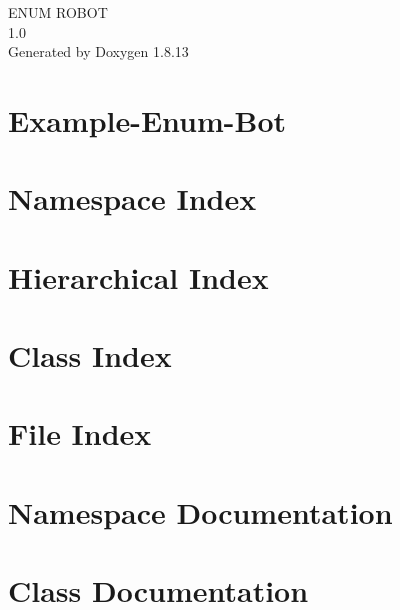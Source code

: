 \documentclass[twoside]{book}
\newcommand{\+}{\discretionary{\mbox{\scriptsize$\hookleftarrow$}}{}{}}
\newcommand{\clearemptydoublepage}{%
  \newpage{\pagestyle{empty}\cleardoublepage}%
}
\begin{document}
\hypersetup{pageanchor=false,
             bookmarksnumbered=true,
             pdfencoding=unicode
            }
\begin{titlepage}
\vspace*{7cm}
\begin{center}%
{\Large E\+N\+UM R\+O\+B\+OT \\[1ex]\large 1.\+0 }\\
\vspace*{1cm}
{\large Generated by Doxygen 1.8.13}\\
\end{center}
\end{titlepage}
\clearemptydoublepage
{}
\tableofcontents
\clearemptydoublepage
{}
\hypersetup{pageanchor=true}

\chapter{Example-\/\+Enum-\/\+Bot}
\label{md__r_e_a_d_m_e}

\chapter{Namespace Index}

\chapter{Hierarchical Index}

\chapter{Class Index}

\chapter{File Index}

\chapter{Namespace Documentation}




\chapter{Class Documentation}













\end{document}
